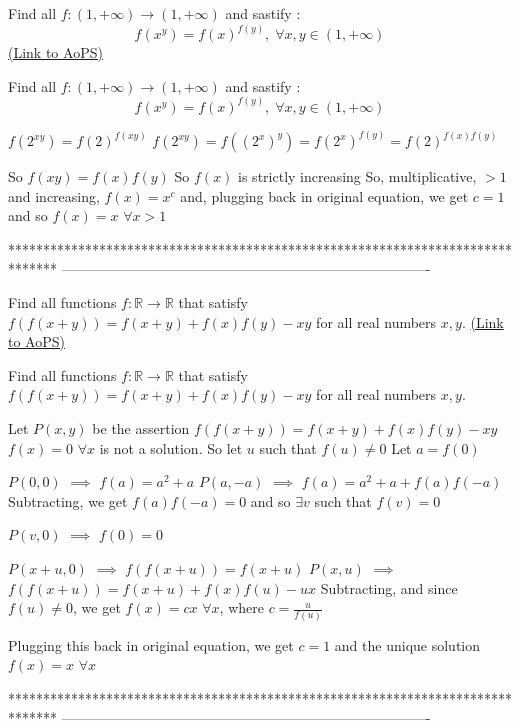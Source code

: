 \begin{problem}
	Find all $f:\left ( 1,+\infty \right )\rightarrow \left ( 1,+\infty \right )$ and sastify :
\[f(x^y)=f(x)^{f(y)},\;\forall x,y\in \left ( 1,+\infty \right )\]
	\flushright \href{https://artofproblemsolving.com/community/c6h606853}{(Link to AoPS)}
\end{problem}



\begin{solution}
	\begin{tcolorbox}Find all $f:\left ( 1,+\infty \right )\rightarrow \left ( 1,+\infty \right )$ and sastify :
\[f(x^y)=f(x)^{f(y)},\;\forall x,y\in \left ( 1,+\infty \right )\]\end{tcolorbox}
$f(2^{xy})=f(2)^{f(xy)}$
$f(2^{xy})=f((2^x)^y)=f(2^x)^{f(y)}=f(2)^{f(x)f(y)}$

So $f(xy)=f(x)f(y)$ 
So $f(x)$ is strictly increasing
So, multiplicative, $>1$ and increasing, $f(x)=x^c$ and, plugging back in original equation, we get $c=1$ and so $\boxed{f(x)=x}$ $\forall x>1$
\end{solution}
*******************************************************************************
-------------------------------------------------------------------------------

\begin{problem}
	Find all functions $f : \mathbb{R} \to \mathbb{R}$ that satisfy $f(f(x + y)) = f(x + y) + f(x)f(y) - xy$ for all real numbers $x, y$.
	\flushright \href{https://artofproblemsolving.com/community/c6h607396}{(Link to AoPS)}
\end{problem}



\begin{solution}
	\begin{tcolorbox}Find all functions $f : \mathbb{R} \to \mathbb{R}$ that satisfy $f(f(x + y)) = f(x + y) + f(x)f(y) - xy$ for all real numbers $x, y$.\end{tcolorbox}
Let $P(x,y)$ be the assertion $f(f(x+y))=f(x+y)+f(x)f(y)-xy$
$f(x)=0$ $\forall x$ is not a solution. So let $u$ such that $f(u)\ne 0$
Let $a=f(0)$

$P(0,0)$ $\implies$ $f(a)=a^2+a$
$P(a,-a)$ $\implies$ $f(a)=a^2+a+f(a)f(-a)$
Subtracting, we get $f(a)f(-a)=0$ and so $\exists v$ such that $f(v)=0$

$P(v,0)$ $\implies$ $f(0)=0$

$P(x+u,0)$ $\implies$ $f(f(x+u))=f(x+u)$
$P(x,u)$ $\implies$ $f(f(x+u))=f(x+u)+f(x)f(u)-ux$
Subtracting, and since $f(u)\ne 0$, we get $f(x)=cx$ $\forall x$, where $c=\frac u{f(u)}$

Plugging this back in original equation, we get $c=1$ and the unique solution $\boxed{f(x)=x}$ $\forall x$
\end{solution}
*******************************************************************************
-------------------------------------------------------------------------------

